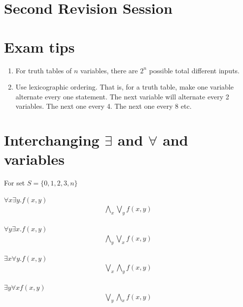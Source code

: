 \documentclass[a4paper]{article}
\theoremstyle{plain}
\theoremstyle{definition}
\newtheorem{exmp}{Example}[section]
\theoremstyle{remark}
\begin{document}
\section{Second Revision Session}

\section{Exam tips}
\begin{enumerate} 
	\item For truth tables of $n$ variables, there are $2^{n}$ possible total different inputs.
	\item Use lexicographic ordering. That is, for a truth table, make one variable alternate every one statement. The next variable will alternate every 2 variables. The next one every 4. The next one every 8 etc.  	
\end{enumerate}
\newpage 
\appendix
\section{Interchanging $\exists $ and $\forall $ and variables}
For set $S = \{0,1,2,3,n\}$
\begin{tcolorbox}[colback=black!3!white,colframe=black!60!white,title=\begin{exmp}Example 1 \label{Example 1}\end{exmp}]
$\forall x \exists y . f(x,y)$
\begin{align}
	\bigwedge_x \bigvee_y f(x,y)
\end{align}
\end{tcolorbox} 
\begin{tcolorbox}[colback=black!3!white,colframe=black!60!white,title=\begin{exmp}Example 2 \label{Example 2}\end{exmp}] 
$\forall y \exists x.f(x,y)$ \begin{align} \bigwedge_y \bigvee_x f(x,y)
\end{align}
	\end{tcolorbox}
	\begin{tcolorbox}[colback=black!3!white,colframe=black!60!white,title=\begin{exmp}Example 3 \label{Example 3}\end{exmp}]
	$\exists x \forall y . f(x,y)$ \begin{align} \bigvee_x \bigwedge_y f(x,y)	
		\end{align} 
		\end{tcolorbox}
		\begin{tcolorbox}[colback=black!3!white,colframe=black!60!white,title=\begin{exmp}Example 4 \label{Example 4}\end{exmp}]
		$\exists y\forall x f(x,y)$ \begin{align} \bigvee_y \bigwedge_x f(x,y) \end{align}
		\end{tcolorbox}
		
\end{document}
